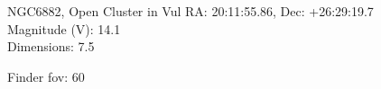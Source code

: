 \begin{block}{NGC6882, Open Cluster in Vul}
    RA: 20:11:55.86, Dec: +26:29:19.7 \\ 
    Magnitude (V): 14.1 \\ 
    Dimensions: 7.5 

    Finder fov: 60 

     
\end{block}